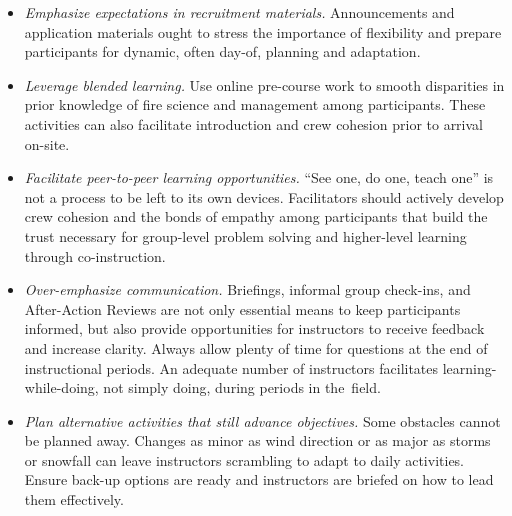 \documentclass[fire,casereport,accept,moreauthors,pdftex]{Definitions/mdpi}  %
\begin{document}
\begin{itemize}
    \item \emph{Emphasize expectations in recruitment materials.} Announcements and application materials ought to stress the importance of flexibility and prepare participants for dynamic, often day-of, planning and adaptation. 
    \item \emph{Leverage blended learning.} Use online pre-course work to smooth disparities in prior knowledge of fire science and management among participants. 
    These activities can also facilitate introduction and crew cohesion prior to arrival on-site.
    \item \emph{Facilitate peer-to-peer learning opportunities.} ``See one, do one, teach one'' is not a process to be left to its own devices. Facilitators should actively develop crew cohesion and the bonds of empathy among participants that build the trust necessary for group-level problem solving and higher-level learning through co-instruction. 
    \item \emph{Over-emphasize communication.} Briefings, informal group check-ins, and After-Action Reviews are not only essential means to keep participants informed, but also provide opportunities for instructors to receive feedback and increase clarity. Always allow plenty of time for questions at the end of instructional periods. An adequate number of instructors facilitates learning-while-doing, not simply doing, during periods in the~field. 
    \item \emph{Plan alternative activities that still advance objectives.} Some obstacles cannot be planned away. Changes as minor as wind direction or as major as storms or snowfall can leave instructors scrambling to adapt to daily activities. Ensure back-up options are ready and instructors are briefed on how to lead them effectively.   

\end{itemize}

\vspace{6pt}



\end{document}
